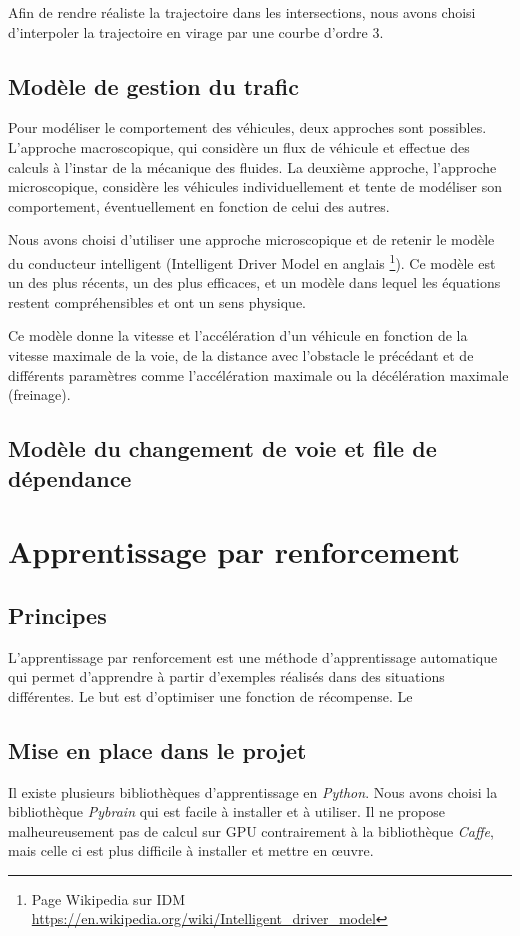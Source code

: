\documentclass[11pt]{article}
\begin{document}
Afin de rendre réaliste la trajectoire dans les intersections, nous avons choisi d'interpoler la trajectoire en virage par une courbe d'ordre 3. 
\subsection{Modèle de gestion du trafic}
Pour modéliser le comportement des véhicules, deux approches sont possibles. L’approche macroscopique, qui considère un flux de véhicule et effectue des calculs à l'instar de la mécanique des fluides. La deuxième approche, l'approche microscopique, considère les véhicules individuellement et tente de modéliser son comportement, éventuellement en fonction de celui des autres. 

Nous avons choisi d'utiliser une approche microscopique et de retenir le modèle du conducteur intelligent (Intelligent Driver Model en anglais \footnote{Page Wikipedia sur IDM \url{https://en.wikipedia.org/wiki/Intelligent_driver_model}}). Ce modèle est un des plus récents, un des plus efficaces, et un modèle dans lequel les équations restent compréhensibles et ont un sens physique.

Ce modèle donne la vitesse et l'accélération d'un véhicule en fonction de la vitesse maximale de la voie, de la distance avec l'obstacle le précédant et de différents paramètres comme l'accélération maximale ou la décélération maximale (freinage).

\subsection{Modèle du changement de voie et file de dépendance}

\section{Apprentissage par renforcement}
\subsection{Principes}
L'apprentissage par renforcement est une méthode d'apprentissage automatique qui permet d'apprendre à partir d'exemples réalisés dans des situations différentes. Le but est d'optimiser une fonction de récompense. Le 

\subsection{Mise en place dans le projet}
Il existe plusieurs bibliothèques d'apprentissage en \emph{Python}. Nous avons choisi la bibliothèque \emph{Pybrain} qui est facile à installer et à utiliser. Il ne propose malheureusement pas de calcul sur GPU contrairement à la bibliothèque \emph{Caffe}, mais celle ci est plus difficile à installer et mettre en \oe uvre. 
\end{document}
